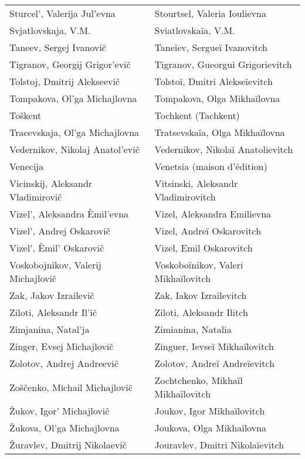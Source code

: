 {\begin{longtable}[c]{ll}
 \\
 Sturcel', Valerija Jul'evna
 & Stourtsel, Valeria Ioulievna
 \\
 Svjatlovskaja, V.M.
 & Sviatlovskaïa, V.M.
 \\
 Taneev, Sergej Ivanovič
 & Taneïev, Sergueï Ivanovitch
 \\
 Tigranov, Georgij Grigor'evič
 & Tigranov, Gueorgui Grigorievitch
 \\
 Tolstoj, Dmitrij Alekseevič
 & Tolstoï, Dmitri Alekseïevitch
 \\
 Tompakova, Ol'ga Michajlovna
 & Tompakova, Olga Mikhaïlovna
 \\
 Toškent
 & Tochkent (Tachkent)
 \\
 Tracevskaja, Ol'ga Michajlovna
 & Tratsevskaïa, Olga Mikhaïlovna
 \\
 Vedernikov, Nikolaj Anatol'evič
 & Vedernikov, Nikolaï Anatolievitch
 \\
 Venecija
 & Venetsia (maison d'édition)
 \\
 Vicinskij, Aleksandr Vladimirovič
 & Vitsinski, Aleksandr Vladimirovitch
 \\
 Vizel', Aleksandra Èmil'evna
 & Vizel, Aleksandra Emilievna
 \\
 Vizel', Andrej Oskarovič
 & Vizel, Andreï Oskarovitch
 \\
 Vizel', Èmil' Oskarovič
 & Vizel, Emil Oskarovitch
 \\
 Voskobojnikov, Valerij Michajlovič
 & Voskoboïnikov, Valeri Mikhaïlovitch
 \\
 Zak, Jakov Izrailevič
 & Zak, Iakov Izraïlevitch
 \\
 Ziloti, Aleksandr Il'ič
 & Ziloti, Aleksandr Ilitch
 \\
 Zimjanina, Natal'ja
 & Zimianina, Natalia
 \\
 Zinger, Evsej Michajlovič
 & Zinguer, Ievseï Mikhaïlovitch
 \\
 Zolotov, Andrej Andreevič
 & Zolotov, Andreï Andreïevitch
 \\
 Zoščenko, Michail Michajlovič
 & Zochtchenko, Mikhaïl Mikhaïlovitch
 \\
 Žukov, Igor' Michajlovič
 & Joukov, Igor Mikhaïlovitch
 \\
 Žukova, Ol'ga Michajlovna
 & Joukova, Olga Mikhaïlovna
 \\
 Žuravlev, Dmitrij Nikolaevič
 & Jouravlev, Dmitri Nikolaïevitch
 \\
\end{longtable}}
